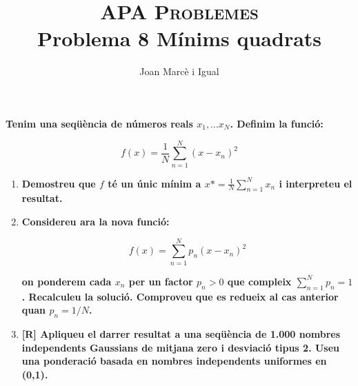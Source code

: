 \documentclass[a4paper]{article}
\title{\textsc{APA Problemes} \\ Problema 8 Mínims quadrats}
\author{Joan Marcè i Igual}
\date{}
\begin{document}
\maketitle

\textbf{Tenim una seqüència de números reals $x_1,...x_N$. Definim la funció:}

$$ f(x) = \frac{1}{N}\sum_{n=1}^N(x - x_n)^2 $$

\begin{enumerate}

\item \textbf{Demostreu que $f$ té un únic mínim a $x* = \frac{1}{N} \sum_{n=1}^N x_n$ i interpreteu el resultat.}

\item \textbf{Considereu ara la nova funció:}

$$ f(x) = \sum_{n=1}^N p_n (x - x_n)^2 $$

\textbf{on ponderem cada $x_n$ per un factor $p_n > 0$ que compleix $\sum_{n=1}^N p_n = 1$. Recalculeu la solució. Comproveu que es redueix al cas anterior quan $p_n = 1/N$.}

\item \textbf{[R] Apliqueu el darrer resultat a una seqüència de 1.000 nombres independents Gaussians de mitjana zero i desviació tipus 2. Useu una ponderació basada en nombres independents uniformes en (0,1).}

\end{enumerate}
\end{document}
